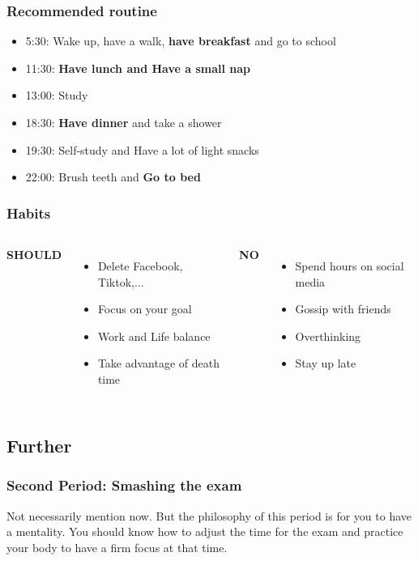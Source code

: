 \documentclass{beamer}
\begin{document}
\begin{frame}
    \frametitle{Recommended routine}
\begin{itemize}
    \item 5:30: Wake up, have a walk, \textbf{have breakfast} and go to school
    \item 11:30: \textbf{Have lunch and Have a small nap}
    \item 13:00: Study
    \item 18:30: \textbf{Have dinner} and take a shower
    \item 19:30: Self-study and Have a lot of light snacks
    \item 22:00: Brush teeth and \textbf{Go to bed}
\end{itemize}
\end{frame}
\begin{frame}
    \frametitle{Habits}
    \begin{columns}
        \textbf{SHOULD}
        \begin{itemize}
            \item Delete Facebook, Tiktok,...
            \item Focus on your goal
            \item Work and Life balance
            \item Take advantage of death time
        \end{itemize}
        
        \textbf{NO}
        \begin{itemize}
            \item Spend hours on social media
            \item Gossip with friends
            \item Overthinking
            \item Stay up late
        \end{itemize}
        \end{columns}
\end{frame}
\subsection{Further}
\begin{frame}
    \frametitle{Second Period: Smashing the exam}
    Not necessarily mention now. But the philosophy of this period is for you to have a mentality. You should know how to adjust the time for the exam and practice your body to have a firm focus at that time.
\end{frame}
\end{document}
